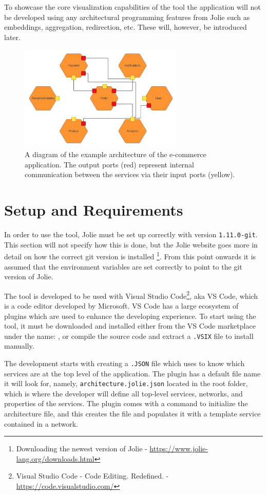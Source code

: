 To showcase the core visualization capabilities of the tool the application will not be developed using any architectural programming features from Jolie such as embeddings, aggregation, redirection, etc.
These will, however, be introduced later.

\begin{figure}[t]
    \center
    \includegraphics[width=0.70\textwidth]{figures/full_example_lc.png}
    \caption{A diagram of the example architecture of the e-commerce application. The output ports (red) represent internal communication between the services via their input ports (yellow).}
    \label{figure:full_example_lc}
\end{figure}

\section{Setup and Requirements}
In order to use the tool, Jolie must be set up correctly with version \texttt{1.11.0-git}. This section will not specify how this is done, but the Jolie website goes more in detail on how
the correct git version is installed \footnote{Downloading the newest version of Jolie - \url{https://www.jolie-lang.org/downloads.html}}. From this point onwards it is assumed that the environment variables are set correctly to point to the git version of Jolie.

The tool is developed to be used with Visual Studio Code\footnote{Visual Studio Code - Code Editing. Redefined. - \url{https://code.visualstudio.com/}}, aka VS Code, which is a code editor developed by Microsoft.
VS Code has a large ecosystem of plugins which are used to enhance the developing experience.
To start using the tool, it must be downloaded and installed either from the VS Code marketplace under the name: \texttt{\toolname}, or compile the source code and extract a \texttt{.VSIX} file to install manually.

The development starts with creating a \texttt{.JSON} file which \toolname[] uses to know which services are at the top level of the application.
The plugin has a default file name it will look for, namely, \texttt{architecture.jolie.json} located in the root folder, which is where the developer will define all top-level services, networks, and properties of the services.
The plugin comes with a command to initialize the architecture file, and this creates the file and populates it with a template service contained in a network.

